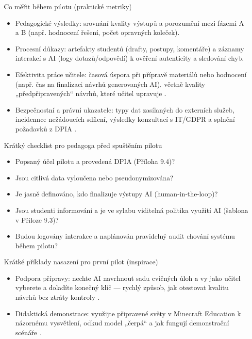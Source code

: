 \documentclass{report}%
\begin{document}
Co měřit během pilotu (praktické metriky)
\begin{itemize}
  \item Pedagogické výsledky: srovnání kvality výstupů a porozumění mezi fázemi A a B (např. hodnocení řešení, počet opravných koleček).
  \item Procesní důkazy: artefakty studentů (drafty, postupy, komentáře) a záznamy interakcí s AI (logy dotazů/odpovědí) k ověření autenticity a sledování chyb.
  \item Efektivita práce učitele: časová úspora při přípravě materiálů nebo hodnocení (např. čas na finalizaci návrhů generovaných AI), včetně kvality „předpřipravených“ návrhů, které učitel upravuje \cite{kb_ai_101_tipu_pdf_04e4a115_page_8_1}.
  \item Bezpečnostní a právní ukazatele: typy dat zasílaných do externích služeb, incidennce nežádoucích sdílení, výsledky konzultací s IT/GDPR a splnění požadavků z DPIA \cite{kb_malinka_chatgpt_ve_vyuce_dva_roky_pote_2024_pdf_90bc3aaf_page_12_1}.
\end{itemize}

Krátký checklist pro pedagoga před spuštěním pilotu
\begin{itemize}
  \item Popsaný účel pilotu a provedená DPIA (Příloha 9.4)? \cite{kb_malinka_chatgpt_ve_vyuce_dva_roky_pote_2024_pdf_90bc3aaf_page_12_1}
  \item Jsou citlivá data vyloučena nebo pseudonymizována? 
  \item Je jasně definováno, kdo finalizuje výstupy AI (human‑in‑the‑loop)? \cite{kb_ai_101_tipu_pdf_04e4a115_page_8_1}
  \item Jsou studenti informováni a je ve sylabu viditelná politika využití AI (šablona v Příloze 9.3)?
  \item Budou logovány interakce a naplánován pravidelný audit chování systému během pilotu?
\end{itemize}

Krátké příklady nasazení pro první pilot (inspirace)
\begin{itemize}
  \item Podpora přípravy: nechte AI navrhnout sadu cvičných úloh a vy jako učitel vyberete a doladíte konečný klíč — rychlý způsob, jak otestovat kvalitu návrhů bez ztráty kontroly \cite{kb_ai_101_tipu_pdf_04e4a115_page_8_1}.
  \item Didaktická demonstrace: využijte připravené světy v Minecraft Education k názornému vysvětlení, odkud model „čerpá“ a jak fungují demonstrační scénáře \cite{kb_ai_101_tipu_pdf_04e4a115_page_15_2}.
\end{itemize}
\end{document}
